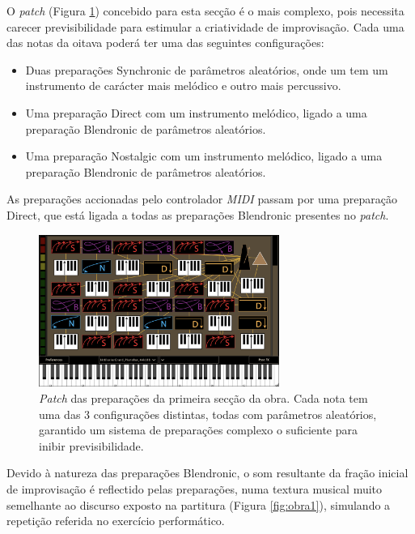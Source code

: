 \documentclass[../main.tex]{subfiles}
\begin{document}
O \textsl{patch} (Figura \ref{fig:bit1}) concebido para esta secção é o mais complexo, pois necessita carecer previsibilidade para estimular a criatividade de improvisação. Cada uma das notas da oitava poderá ter uma das seguintes configurações:
\begin{itemize}
    \item Duas preparações Synchronic de parâmetros aleatórios, onde um tem um instrumento de carácter mais melódico e outro mais percussivo.
    \item Uma preparação Direct com um instrumento melódico, ligado a uma preparação Blendronic de parâmetros aleatórios.
    \item Uma preparação Nostalgic com um instrumento melódico, ligado a uma preparação Blendronic de parâmetros aleatórios.
\end{itemize}
As preparações accionadas pelo controlador \textsl{MIDI} passam por uma preparação Direct, que está ligada a todas as preparações Blendronic presentes no \textsl{patch}.

\begin{figure}[h]
    \centering
    \captionsetup{width=0.8\textwidth}
    \includegraphics[width=0.7\textwidth]{images/bit1.png}
    \caption{\textsl{Patch} das preparações da primeira secção da obra. Cada nota tem uma das 3 configurações distintas, todas com parâmetros aleatórios, garantido um sistema de preparações complexo o suficiente para inibir previsibilidade.}
    \label{fig:bit1}
\end{figure}

Devido à natureza das preparações Blendronic, o som resultante da fração inicial de improvisação é reflectido pelas preparações, numa textura musical muito semelhante ao discurso exposto na partitura (Figura \ref{fig:obra1}), simulando a repetição referida no exercício performático.
\end{document}
